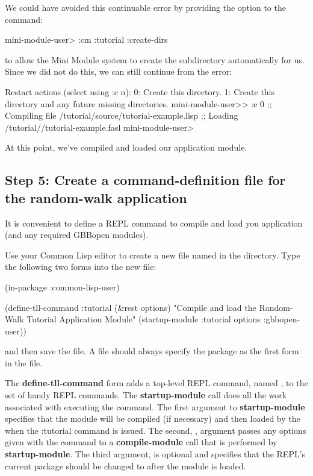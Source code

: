 \documentclass[10pt,twoside,english,pdftex]{article}
\begin{document}
We could have avoided this continuable error by providing the
 option to the  command:
%
\W\supp
\begin{example}
\textcolor{darkergray}{%
  mini-module-user> :cm :tutorial :create-dirs}
\end{example}
%
to allow the Mini Module system to create the 
subdirectory automatically for us.  Since we did not do this, we can still
continue from the error:
%
\W\supp\notpretop
\begin{example}
\textcolor{darkergray}{%
  Restart actions (select using :c n):
    0: Create this directory.
    1: Create this directory and any future missing directories.
  mini-module-user>> \textcolor{black}{:c 0}
  ;; Compiling file /tutorial/source/tutorial-example.lisp
  ;; Loading /tutorial//tutorial-example.fasl
  mini-module-user>}
\end{example}

At this point, we've compiled and loaded our  application
module.

\subsection*{Step 5: Create a command-definition file for the random-walk
  application}

It is convenient to define a REPL command to compile and load you application
(and any required GBBopen modules).  

Use your Common Lisp editor to create a new file named  in
the  directory. Type the following two forms into the new
 file:
%
\W\supp
\begin{example}
(in-package :common-lisp-user)

(define-tll-command :tutorial (\&rest options)
  "Compile and load the Random-Walk Tutorial Application Module"
  (startup-module :tutorial options :gbbopen-user))
\end{example}
%
and then save the file.  A  file should always specify the
 package as the first form in the file.

The \textbf{define-tll-command} form adds a top-level REPL command, named
, to the set of handy REPL commands.  The
\textbf{startup-module} call does all the work associated with executing the
command.  The first argument to \textbf{startup-module} specifies that the
 module will be compiled (if necessary) and then loaded by the
 when the \code:{tutorial}
command is issued.  The second, , argument passes any options
given with the command to a \textbf{compile-module} call that is performed by
\textbf{startup-module}.  The third argument,  is optional
and specifies that the REPL's current package should be changed to  after the  module is loaded. 
\end{document}

